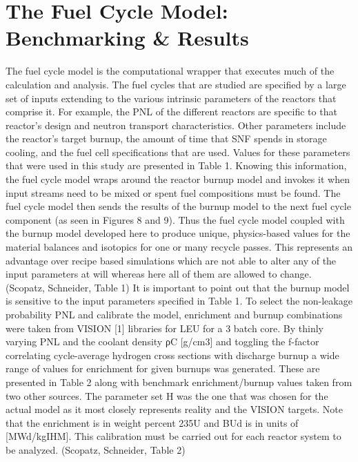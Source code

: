 \section{The Fuel Cycle Model: Benchmarking & Results}
\label{1g_sec:fcmodel_benchmark}
The fuel cycle model is the computational wrapper that executes much of the calculation and analysis.  The fuel cycles that are studied are specified by a large set of inputs extending to the various intrinsic parameters of the reactors that comprise it.  For example, the PNL of the different reactors are specific to that reactor’s design and neutron transport characteristics.  Other parameters include the reactor’s target burnup, the amount of time that SNF spends in storage cooling, and the fuel cell specifications that are used.  Values for these parameters that were used in this study are presented in Table 1.  Knowing this information, the fuel cycle model wraps around the reactor burnup model and invokes it when input streams need to be mixed or spent fuel compositions must be found.  The fuel cycle model then sends the results of the burnup model to the next fuel cycle component (as seen in Figures 8 and 9).  Thus the fuel cycle model coupled with the burnup model developed here to produce unique, physics-based values for the material balances and isotopics for one or many recycle passes.  This represents an advantage over recipe based simulations which are not able to alter any of the input parameters at will whereas here all of them are allowed to change. 
(Scopatz, Schneider, Table 1)
It is important to point out that the burnup model is sensitive to the input parameters specified in Table 1.  To select the non-leakage probability PNL and calibrate the model, enrichment and burnup combinations were taken from VISION [1] libraries for LEU for a 3 batch core.  By thinly varying PNL and the coolant density ρC [g/cm3] and toggling the f-factor correlating cycle-average hydrogen cross sections with discharge burnup a wide range of values for enrichment for given burnups was generated.  These are presented in Table 2 along with benchmark enrichment/burnup values taken from two other sources.  The parameter set H was the one that was chosen for the actual model as it most closely represents reality and the VISION targets.  Note that the enrichment is in weight percent 235U and BUd is in units of [MWd/kgIHM].  This calibration must be carried out for each reactor system to be analyzed.
(Scopatz, Schneider, Table 2)
